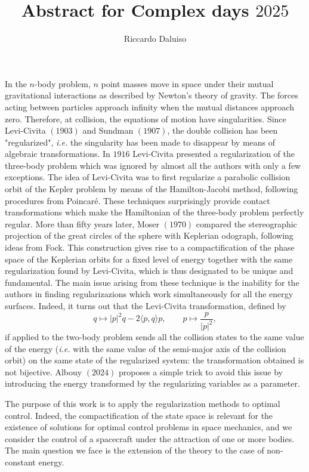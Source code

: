\documentclass{article}
\title{Abstract for Complex days $2025$}
\author{Riccardo Daluiso}
\begin{document}
\maketitle

\section*{}

In the $n$-body problem, $n$ point masses move in space under their mutual gravitational interactions as described by Newton's theory of gravity. The forces acting between particles approach infinity when the mutual distances approach zero. Therefore, at collision, the equations of motion have singularities. Since Levi-Civita $(1903)$ and Sundman $(1907)$, the double collision has been "regularized", \emph{i.e.} the singularity has been made to disappear by means of algebraic transformations. In $1916$ Levi-Civita presented a regularization of the three-body problem which was ignored by almost all the authors with only a few exceptions. The idea of Levi-Civita was to first regularize a parabolic collision orbit of the Kepler problem by means of the Hamilton-Jacobi method, following procedures from Poincaré. These techniques surprisingly provide contact transformations which make the Hamiltonian of the three-body problem perfectly regular. 
More than fifty years later, Moser $(1970)$ compared the stereographic projection of the great circles of the sphere with Keplerian odograph, following ideas from Fock. This construction gives rise to a compactification of the phase space of the Keplerian orbits for a fixed level of energy together with the same regularization found by Levi-Civita, which is thus designated to be unique and fundamental. 
%
The main issue arising from these technique is the inability for the authors in finding regularizazions which work simultaneously for all the energy surfaces. Indeed, it turns out that the Levi-Civita transformation, defined by
\[
q \mapsto |p|^2q - 2 \langle  p , q \rangle p, \qquad p \mapsto \frac{p}{|p|^2},
\]
 if applied to the two-body problem sends all the collision states to the same value of the energy (\emph{i.e.} with the same value of the semi-major axis of the collision orbit) on the same state of the regularized system: the transformation obtained is not bijective. Albouy $(2024)$ proposes a simple trick to avoid this issue by introducing the energy transformed by the regularizing variables as a parameter. 

The purpose of this work is to apply the regularization methods to optimal control. Indeed, the compactification of the state space is relevant for the existence of solutions for optimal control problems in space mechanics, and we 
consider the control of a spacecraft under the attraction of one or more bodies. The main question we face is the extension of the theory to the case of non-constant energy.\\
 
\end{document}
